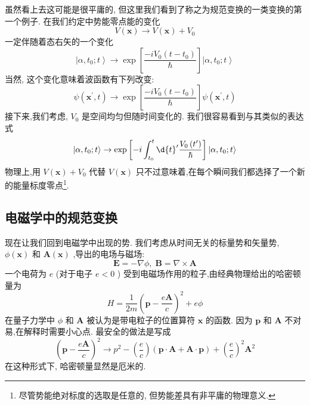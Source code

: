 虽然看上去这可能是很平庸的, 但这里我们看到了称之为规范变换的一类变换的第一个例子. 在我们约定中势能零点能的变化
\begin{equation}
V\left( \mathbf{x}\right) \rightarrow V\left( \mathbf{x}\right) + {V}_{0}
\end{equation}
一定伴随着态右矢的一个变化
\begin{equation}
\left| {\alpha ,{t}_{0};t}\right\rangle \rightarrow \exp \left\lbrack \frac{-i{V}_{0}\left( {t - {t}_{0}}\right) }{\hbar }\right\rbrack \left| {\alpha ,{t}_{0};t}\right\rangle
\end{equation}
当然, 这个变化意味着波函数有下列改变:
\begin{equation}
\psi \left( {{\mathbf{x}}^{\prime }, t}\right) \rightarrow \exp \left\lbrack \frac{-i{V}_{0}\left( {t - {t}_{0}}\right) }{\hbar }\right\rbrack \psi \left( {{\mathbf{x}}^{\prime }, t}\right)
\end{equation}
接下来,我们考虑, ${V}_{0}$ 是空间均匀但随时间变化的. 我们很容易看到与其类似的表达式
\begin{equation}
\left| {\alpha ,{t}_{0};t}\right\rangle \rightarrow \exp \left\lbrack {-i\int_{{t}_{0}}^{t}\d{t}^{\prime }\frac{{V}_{0}\left( {t}^{\prime }\right) }{\hbar }}\right\rbrack \left| {\alpha ,{t}_{0};t}\right\rangle
\end{equation}
物理上,用 $V\left( \mathbf{x}\right) + {V}_{0}$ 代替 $V\left( \mathbf{x}\right)$ 只不过意味着,在每个瞬间我们都选择了一个新的能量标度零点\footnote{尽管势能绝对标度的选取是任意的, 但势能差具有非平庸的物理意义.}.
\subsection{电磁学中的规范变换}
现在让我们回到电磁学中出现的势. 我们考虑从时间无关的标量势和矢量势, $\phi \left( \mathbf{x}\right)$ 和 $\mathbf{A}\left( \mathbf{x}\right)$ ,导出的电场与磁场:
\begin{equation}
\mathbf{E} = - \nabla \phi ,\;\mathbf{B} = \nabla \times \mathbf{A}
\end{equation}
一个电荷为 $e$ (对于电子 $e < 0$ ) 受到电磁场作用的粒子,由经典物理给出的哈密顿量为
\begin{equation}
H = \frac{1}{2m}{\left( \mathbf{p} - \frac{e\mathbf{A}}{c}\right) }^{2} + {e\phi }
\end{equation}
在量子力学中 $\phi$ 和 $\mathbf{A}$ 被认为是带电粒子的位置算符 $\mathbf{x}$ 的函数. 因为 $\mathbf{p}$ 和 $\mathbf{A}$ 不对易,在解释时需要小心点. 最安全的做法是写成
\begin{equation}
{\left( \mathbf{p} - \frac{e\mathbf{A}}{c}\right) }^{2} \rightarrow {p}^{2} - \left( \frac{e}{c}\right) \left( {\mathbf{p} \cdot \mathbf{A} + \mathbf{A} \cdot \mathbf{p}}\right) + {\left( \frac{e}{c}\right) }^{2}{\mathbf{A}}^{2}
\end{equation}
在这种形式下, 哈密顿量显然是厄米的.

